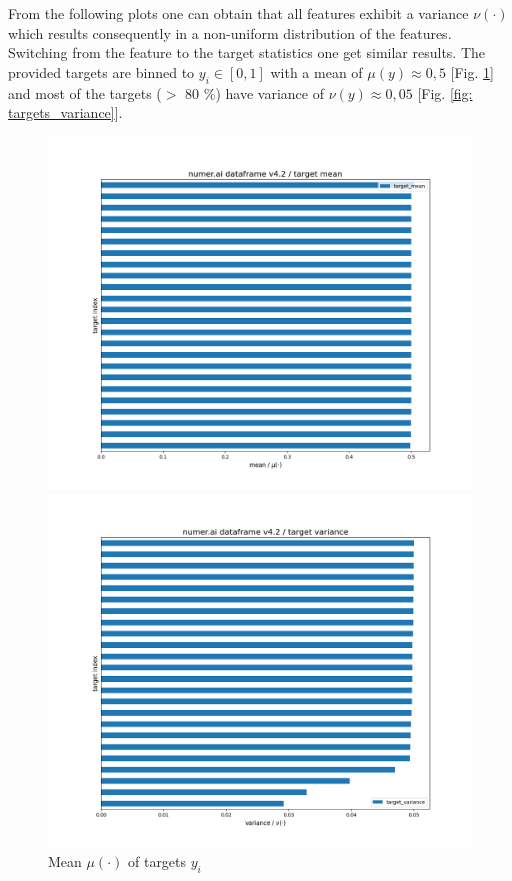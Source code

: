 \documentclass[12pt, a4paper]{article}
\begin{document}
From the following plots one can obtain that all features exhibit a variance $\nu(\cdot)$ which results consequently in a non-uniform distribution of the features.
Switching from the feature to the target statistics one get similar results. The provided targets are binned to $y_i \in [0,1]$ with a mean of $\mu(y) \approx 0{,}5$ [Fig. \ref{fig: targets_mean}] and most of the targets ($>$ 80 \%) have variance of $\nu(y) \approx 0{,}05$ [Fig. \ref{fig: targets_variance}].
\begin{figure}[htbp]
\begin{minipage}[t]{8.5cm}
\vspace{0pt}
\centering
\includegraphics[width=1\textwidth,trim={0 0 0 0},clip]{figures/train_df_targets_mean_horizontal_barplot_2023-11-18.png}
\caption[Mean of Targets]{Mean $\mu(\cdot)$ of targets $y_i$}
\label{fig: targets_mean}
\end{minipage}
\hfill
\begin{minipage}[t]{8.5cm}
\vspace{0pt}
\centering
\includegraphics[width=1\textwidth,trim={0 0 0 0},clip]{figures/train_df_targets_variance_horizontal_barplot_2023-11-18.png}

\end{minipage}
\end{figure}
\end{document}
